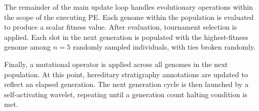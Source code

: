 The remainder of the main update loop handles evolutionary operations within the scope of the executing PE.
Each genome within the population is evaluated to produce a scalar fitness value.
After evaluation, tournament selection is applied.
Each slot in the next generation is populated with the highest-fitness genome among $n=5$ randomly sampled individuals, with ties broken randomly.

Finally, a mutational operator is applied across all genomes in the next population.
At this point, hereditary stratigraphy annotations are updated to reflect an elapsed generation.
The next generation cycle is then launched by a self-activating wavelet, repeating until a generation count halting condition is met.




